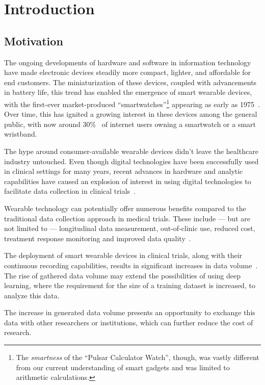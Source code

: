 \chapter{Introduction}\label{ch:introduction}

\section{Motivation}\label{sec:motivation}

The ongoing developments of hardware and software in information technology have made electronic devices steadily more compact, lighter, and affordable for end customers.
The miniaturization of these devices, coupled with advancements in battery life, this trend has enabled the emergence of smart wearable devices, with the first-ever market-produced ``smartwatches''\footnote{The \textit{smartness} of the ``Pulsar Calculator Watch'', though, was vastly different from our current understanding of smart gadgets and was limited to arithmetic calculations.} appearing as early as 1975~\cite{ometov_survey_2021}.
Over time, this has ignited a growing interest in these devices among the general public, with now around 30\%~\cite{simon_kemp_rise_2023} of internet users owning a smartwatch or a smart wristband.

The hype around consumer-available wearable devices didn't leave the healthcare industry untouched.
Even though digital technologies have been successfully used in clinical settings for many years, recent advances in hardware and analytic capabilities have caused an explosion of interest in using digital technologies to facilitate data collection in clinical trials~\cite{clay_impact_2017}.

Wearable technology can potentially offer numerous benefits compared to the traditional data collection approach in medical trials.
These include --- but are not limited to --- longitudinal data measurement, out-of-clinic use, reduced cost, treatment response monitoring and improved data quality~\cite{munos_mobile_2016}.

The deployment of smart wearable devices in clinical trials, along with their continuous recording capabilities, results in significant increases in data volume~\cite{munos_mobile_2016}.
The rise of gathered data volume may extend the possibilities of using deep learning, where the requirement for the size of a training dataset is increased, to analyze this data.


The increase in generated data volume presents an opportunity to exchange this data with other researchers or institutions, which can further reduce the cost of research.

